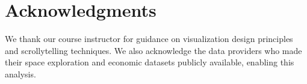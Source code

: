 \documentclass[sigconf]{acmart}
\begin{document}
\section*{Acknowledgments}

We thank our course instructor for guidance on visualization design principles and scrollytelling techniques. We also acknowledge the data providers who made their space exploration and economic datasets publicly available, enabling this analysis.



\end{document}
